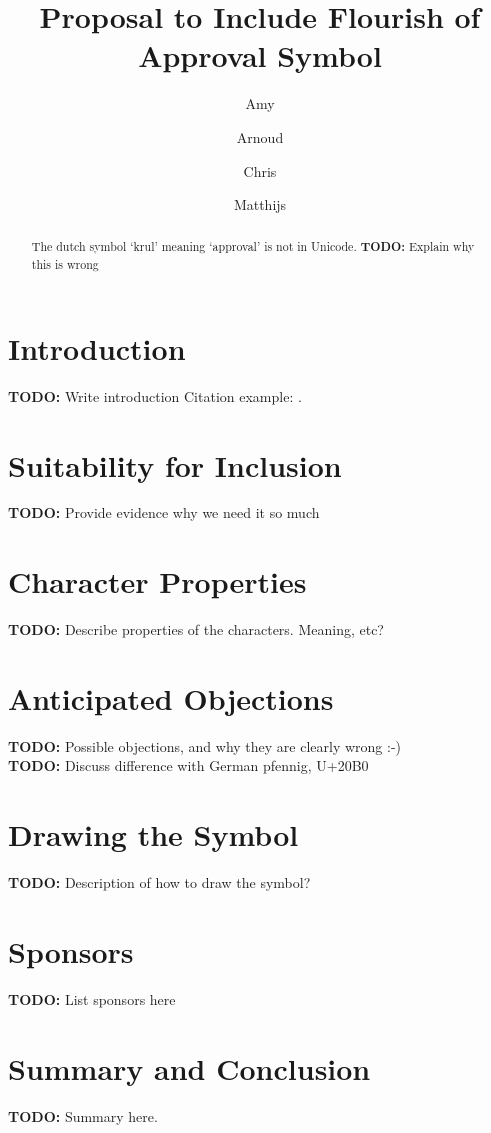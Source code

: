 \documentclass[10pt,a4paper]{article}
\title{Proposal to Include Flourish of Approval Symbol}
\author{
	Amy  \and
	Arnoud \and
	Chris \and
	Matthijs
}
\begin{document}
\newcommand{\todo}[1]{{\color{BrickRed}\textbf{TODO:} #1}}

\maketitle

\pagestyle{myheadings}

\begin{abstract}
The dutch symbol `krul' meaning `approval' is not in Unicode. \todo{Explain why this is wrong} 
\end{abstract}

\section{Introduction}

\todo{Write introduction}
Citation example: \cite{knuthwebsite}.

\section{Suitability for Inclusion}

\todo{Provide evidence why we need it so much}

\section{Character Properties}

\todo{Describe properties of the characters. Meaning, etc?}

\section{Anticipated Objections}

\todo{Possible objections, and why they are clearly wrong :-)}\\
\todo{Discuss difference with German pfennig, U+20B0}

\section{Drawing the Symbol}

\todo{Description of how to draw the symbol?}

\section{Sponsors}

\todo{List sponsors here}

\section{Summary and Conclusion}

\todo{Summary here.}



\end{document}
